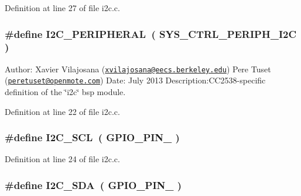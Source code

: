 Definition at line 27 of file i2c.\+c.

\subsubsection[{\texorpdfstring{I2\+C\+\_\+\+P\+E\+R\+I\+P\+H\+E\+R\+AL}{I2C_PERIPHERAL}}]{\setlength{\rightskip}{0pt plus 5cm}\#define I2\+C\+\_\+\+P\+E\+R\+I\+P\+H\+E\+R\+AL~( {\bf S\+Y\+S\+\_\+\+C\+T\+R\+L\+\_\+\+P\+E\+R\+I\+P\+H\+\_\+\+I2C} )}\hypertarget{_open_mote-_c_c2538_2i2c_8c_a946d4dc7e4d2270c1388c78ba919ce83}{}\label{_open_mote-_c_c2538_2i2c_8c_a946d4dc7e4d2270c1388c78ba919ce83}
Author\+: Xavier Vilajosana (\href{mailto:xvilajosana@eecs.berkeley.edu}{\tt xvilajosana@eecs.\+berkeley.\+edu}) Pere Tuset (\href{mailto:peretuset@openmote.com}{\tt peretuset@openmote.\+com}) Date\+: July 2013 Description\+:C\+C2538-\/specific definition of the \char`\"{}i2c\char`\"{} bsp module. 

Definition at line 22 of file i2c.\+c.

\subsubsection[{\texorpdfstring{I2\+C\+\_\+\+S\+CL}{I2C_SCL}}]{\setlength{\rightskip}{0pt plus 5cm}\#define I2\+C\+\_\+\+S\+CL~( {\bf G\+P\+I\+O\+\_\+\+P\+I\+N\+\_} )}\hypertarget{_open_mote-_c_c2538_2i2c_8c_a212ca328a6409c98f8c3dfbbe1ba561d}{}\label{_open_mote-_c_c2538_2i2c_8c_a212ca328a6409c98f8c3dfbbe1ba561d}


Definition at line 24 of file i2c.\+c.

\subsubsection[{\texorpdfstring{I2\+C\+\_\+\+S\+DA}{I2C_SDA}}]{\setlength{\rightskip}{0pt plus 5cm}\#define I2\+C\+\_\+\+S\+DA~( {\bf G\+P\+I\+O\+\_\+\+P\+I\+N\+\_} )}\hypertarget{_open_mote-_c_c2538_2i2c_8c_a18aefd12ad84d4c33dc97923cb821e47}{}\label{_open_mote-_c_c2538_2i2c_8c_a18aefd12ad84d4c33dc97923cb821e47}


